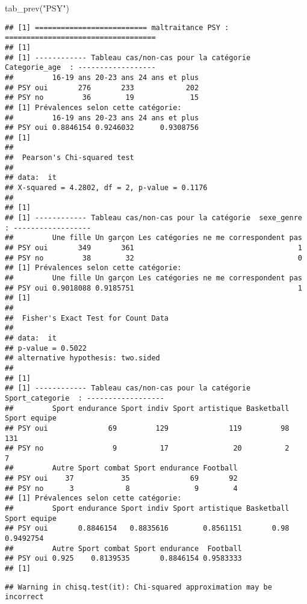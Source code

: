 \documentclass[
]{article}
\newenvironment{Shaded}{\begin{snugshade}}{\end{snugshade}}
\newcommand{\FunctionTok}[1]{\textcolor[rgb]{0.00,0.00,0.00}{#1}}
\newcommand{\NormalTok}[1]{#1}
\newcommand{\StringTok}[1]{\textcolor[rgb]{0.31,0.60,0.02}{#1}}
\begin{document}
\begin{Shaded}
\begin{Highlighting}[]
\FunctionTok{tab\_prev}\NormalTok{(}\StringTok{"PSY"}\NormalTok{)}
\end{Highlighting}
\end{Shaded}

\begin{verbatim}
## [1] ========================== maltraitance PSY : ===================================
## [1] 
## [1] ------------ Tableau cas/non-cas pour la catégorie  Categorie_age  : ------------------
##         16-19 ans 20-23 ans 24 ans et plus
## PSY oui       276       233            202
## PSY no         36        19             15
## [1] Prévalences selon cette catégorie:
##         16-19 ans 20-23 ans 24 ans et plus
## PSY oui 0.8846154 0.9246032      0.9308756
## [1] 
## 
##  Pearson's Chi-squared test
## 
## data:  it
## X-squared = 4.2802, df = 2, p-value = 0.1176
## 
## [1] 
## [1] ------------ Tableau cas/non-cas pour la catégorie  sexe_genre  : ------------------
##         Une fille Un garçon Les catégories ne me correspondent pas
## PSY oui       349       361                                      1
## PSY no         38        32                                      0
## [1] Prévalences selon cette catégorie:
##         Une fille Un garçon Les catégories ne me correspondent pas
## PSY oui 0.9018088 0.9185751                                      1
## [1] 
## 
##  Fisher's Exact Test for Count Data
## 
## data:  it
## p-value = 0.5022
## alternative hypothesis: two.sided
## 
## [1] 
## [1] ------------ Tableau cas/non-cas pour la catégorie  Sport_categorie  : ------------------
##         Sport endurance Sport indiv Sport artistique Basketball Sport equipe
## PSY oui              69         129              119         98          131
## PSY no                9          17               20          2            7
##         Autre Sport combat Sport endurance Football
## PSY oui    37           35              69       92
## PSY no      3            8               9        4
## [1] Prévalences selon cette catégorie:
##         Sport endurance Sport indiv Sport artistique Basketball Sport equipe
## PSY oui       0.8846154   0.8835616        0.8561151       0.98    0.9492754
##         Autre Sport combat Sport endurance  Football
## PSY oui 0.925    0.8139535       0.8846154 0.9583333
## [1]
\end{verbatim}

\begin{verbatim}
## Warning in chisq.test(it): Chi-squared approximation may be incorrect
\end{verbatim}
\end{document}

